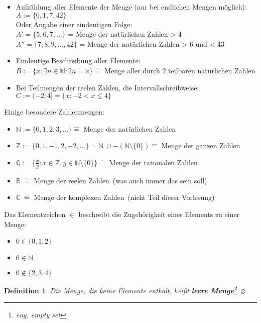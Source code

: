 \documentclass[12pt,german,a4]{article}
\begin{document}
\begin{itemize}
\item Aufzählung aller Elemente der Menge (nur bei endlichen Mengen möglich):\\
$A := \{0, 1, 7, 42\}$\\
Oder Angabe einer eindeutigen Folge:\\
$A' = \{5, 6, 7, ...\}$ = \glqq Menge der natürlichen Zahlen > 4\grqq\\
$A'' = \{7, 8, 9, ..., 42\}$ = \glqq Menge der natürlichen Zahlen > 6 und < 43\grqq
\item Eindeutige Beschreibung aller Elemente:\\
$B := \{x: \exists n \in \mathbb{N}: 2n = x\} \hat{=}$ \glqq Menge aller durch 2 teilbaren natürlichen Zahlen\grqq
\item Bei Teilmengen der reelen Zahlen, die Intervallschreibweise:\\
$C := (-2; 4] = \{x : -2 < x \le 4\}$
\end{itemize}
\pagebreak
Einige besondere Zahlenmengen:
\begin{itemize}
\item $\mathbb{N} := \{0, 1, 2, 3, ...\} \hat{=}$ \glqq Menge der natürlichen Zahlen\grqq
\item $\mathbb{Z} := \{0, 1, -1, 2, -2, ...\} = \mathbb{N}\ \cup -(\mathbb{N} \setminus \{0\}) \hat{=}$ \glqq Menge der ganzen Zahlen\grqq
\item $\mathbb{Q} := \{\frac{x}{y} : x \in \mathbb{Z}, y \in \mathbb{N} \setminus \{0\}\} \hat{=}$ \glqq Menge der rationalen Zahlen\grqq
\item $\mathbb{R}\ \hat{=}$ \glqq Menge der reelen Zahlen\grqq\ (was auch immer das sein soll)
\item $\mathbb{C}\ \hat{=}$ \glqq Menge der komplexen Zahlen\grqq\ (nicht Teil dieser Vorlesung)
\end{itemize}

Das Elementzeichen $\in$ beschreibt die Zugehörigkeit eines Elements zu einer Menge:
\begin{itemize}
\item $0 \in \{0, 1, 2\}$
\item $0 \in \mathbb{N}$
\item $0 \not\in \{2, 3, 4\}$
\end{itemize}

\newtheorem{defEmptySet}[defSet]{Definition}
\begin{defEmptySet}
Die Menge, die keine Elemente enthält, heißt {\bf leere Menge\footnote{eng. empty set} $\varnothing$}.
\end{defEmptySet}
\end{document}
